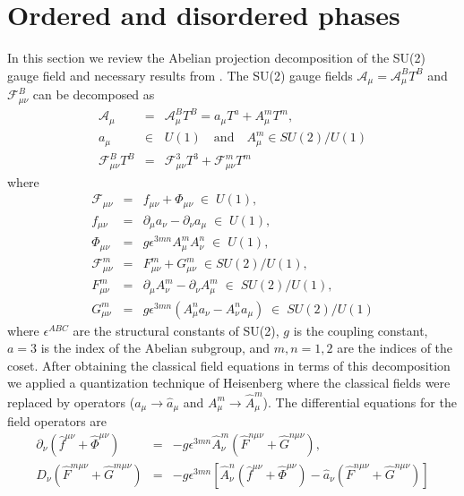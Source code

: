 \documentclass[a4paper,aps,showpacs]{revtex4}
\begin{document}
\section{Ordered and disordered phases}

In this section we review the Abelian projection decomposition of 
the  SU(2) gauge field  \cite{kondo} and necessary results from
\cite{dzhsin02a}. The SU(2) gauge fields  $\mathcal{A}_\mu = 
\mathcal{A}^B_\mu T^B$ and $\mathcal{F}^B_{\mu\nu}$ can be 
decomposed as 
\begin{eqnarray}
  \mathcal{A}_\mu & = & \mathcal{A}^B_\mu T^B = a_\mu T^a + A^m_\mu T^m ,
\label{sec2-10a}\\
  a_\mu & \in & U(1) \quad \text{and} \quad A^m_\mu \in SU(2)/U(1)
\label{sec2-10b}\\
    \mathcal{F}^B_{\mu\nu} T^B & = & \mathcal{F}^3_{\mu\nu}T^3 +
  \mathcal{F}^m_{\mu\nu}T^m
\label{sec2-10c}
\end{eqnarray}
where 
\begin{eqnarray}
  \mathcal{F}_{\mu\nu} & = & f_{\mu\nu} + \Phi_{\mu\nu}
  \; \in \; U(1) ,
\label{sec2-20a}\\
  f_{\mu\nu} & = & \partial_\mu a_\nu - \partial_\nu a_\mu 
  \; \in \; U(1) ,
\label{sec2-20b}\\
  \Phi_{\mu\nu} & = & g \epsilon^{3mn} A^m_\mu A^n_\nu \; \in \; U(1) ,
\label{sec2-20c}\\
  \mathcal{F}^m_{\mu\nu} & = & F^m_{\mu\nu} + G^m_{\mu\nu} \; 
  \in SU(2)/U(1) ,
\label{sec2-20d}\\
  F^m_{\mu\nu} & = & \partial_\mu A^m_\nu - \partial_\nu A^m_\mu 
  \; \in \; SU(2)/U(1) ,
\label{sec2-20e}\\
  G^m_{\mu\nu} & = & g \epsilon^{3mn}
  \left(
  A^n_\mu a_\nu - A^n_\nu a_\mu
  \right) \; \in \; SU(2)/U(1)
\end{eqnarray}
where $\epsilon^{ABC}$ are the structural constants of
SU(2), $g$ is the coupling constant, $a=3$ is the index of the Abelian subgroup, and
$m,n = 1,2$ are the indices of the coset. After obtaining the classical
field equations in terms of this decomposition we applied a
quantization technique of Heisenberg \cite{heisenberg} where the classical 
fields were replaced by operators ($a_{\mu} \rightarrow \hat{a}_\mu$
and $A^m_{\mu} \rightarrow \hat{A}^m_\mu$). The 
differential equations for the field operators are
\begin{eqnarray}
  \partial_\nu \left( \hat{f}^{\mu\nu} + \hat{\Phi}^{\mu\nu} \right) & = &
  -g \epsilon^{3mn} \hat A^m_\nu
  \left(
  \hat F^{n\mu\nu} + \hat G^{n\mu\nu}
  \right),
\label{sec2-50a}\\
  D_\nu \left( \hat F^{m\mu\nu} + \hat G^{m\mu\nu} \right) & = &
  -g \epsilon^{3mn}
  \left[
  \hat A^n_\nu \left( \hat f^{\mu\nu} + \hat \Phi^{\mu\nu} \right) -
  \hat a_\nu \left( \hat F^{n\mu\nu} + \hat G^{n\mu\nu} \right)
  \right]
\label{sec2-50b}
\end{eqnarray} 
\end{document}

